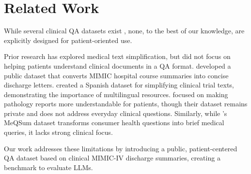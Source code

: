 \section{Related Work}
While several clinical QA datasets exist \citep{pampari-etal-2018-emrqa, lehman-etal-2022-learning, soni-etal-2022-radqa, bardhan-etal-2022-drugehrqa, dada2024information, kweon2024ehrnoteqa}, none, to the best of our knowledge, are explicitly designed for patient-oriented use. 

Prior research has explored medical text simplification, but did not focus on helping patients understand clinical documents in a QA format. \citet{aali2024dataset} developed a public dataset that converts MIMIC hospital course summaries into concise discharge letters. \citet{campillos2022building} created a Spanish dataset for simplifying clinical trial texts, demonstrating the importance of multilingual resources. \citet{trienes-etal-2022-patient} focused on making pathology reports more understandable for patients, though their dataset remains private and does not address everyday clinical questions. Similarly, while \citet{ben-abacha-demner-fushman-2019-summarization}'s MeQSum dataset transforms consumer health questions into brief medical queries, it lacks strong clinical focus.

Our work addresses these limitations by introducing a public, patient-centered QA dataset based on clinical MIMIC-IV discharge summaries, creating a benchmark to evaluate LLMs.